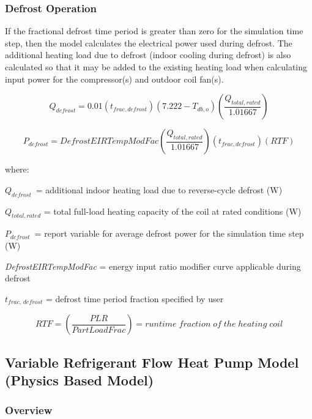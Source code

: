\subsubsection{Defrost Operation}\label{defrost-operation}

If the fractional defrost time period is greater than zero for the simulation time step, then the model calculates the electrical power used during defrost. The additional heating load due to defrost (indoor cooling during defrost) is also calculated so that it may be added to the existing heating load when calculating input power for the compressor(s) and outdoor coil fan(s).

\begin{equation}
  Q_{defrost} = 0.01 \left( t_{frac,defrost} \right) \left( 7.222 - T_{db,o} \right) \left( \frac{Q_{total,rated}}{1.01667} \right)
\end{equation}

\begin{equation}
  P_{defrost} = DefrostEIRTempModFac \left( \frac{Q_{total,rated}}{1.01667} \right) \left( t_{frac,defrost} \right) \left( RTF \right)
\end{equation}

where:

\(Q_{defrost}\) = additional indoor heating load due to reverse-cycle defrost (W)

\(Q_{total,rated}\) = total full-load heating capacity of the coil at rated conditions (W)

\(P_{defrost}\) = report variable for average defrost power for the simulation time step (W)

\emph{DefrostEIRTempModFac} = energy input ratio modifier curve applicable during defrost

\(t_{frac,\,defrost}\) = defrost time period fraction specified by user

\begin{equation}
  RTF = \left(  \frac{PLR}{PartLoadFrac} \right) = runtime\;fraction\;of\;the\;heating\;coil
\end{equation}

\subsection{Variable Refrigerant Flow Heat Pump Model (Physics Based Model)}\label{variable-refrigerant-flow-heat-pump-model-physics-based-model}

\subsubsection{Overview}\label{variable-refrigerant-flow-heat-pump-model-physics-based-model:overview}

